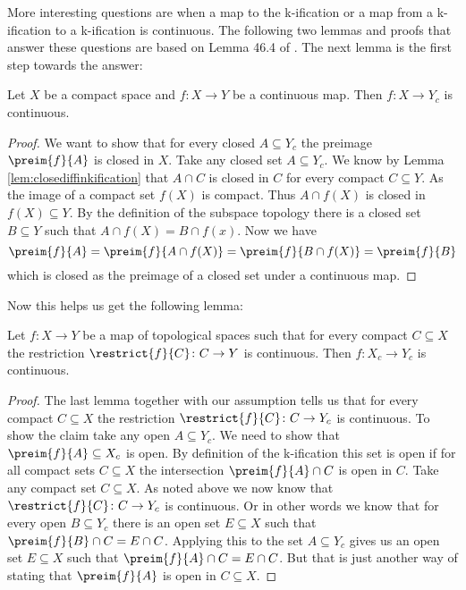 More interesting questions are when a map to the k-ification or a map from a k-ification to a k-ification is continuous. 
The following two lemmas and proofs that answer these questions are based on Lemma 46.4 of \cite{Munkres2014}.
The next lemma is the first step towards the answer:

\begin{lem}\label{lem:continuoustokification}
    Let $X$ be a compact space and $f \colon X \to Y$ be a continuous map. 
    Then $f \colon X \to Y_c$ is continuous.
\end{lem}
\begin{proof}
    We want to show that for every closed $A \subseteq Y_c$ the preimage $\preim{f}{A}$ is closed in $X$.
    Take any closed set $A \subseteq Y_c$. 
    We know by Lemma \ref{lem:closediffinkification} that $A \cap C$ is closed in $C$ for every compact $C \subseteq Y$.
    As the image of a compact set $f(X)$ is compact. 
    Thus $A \cap f(X)$ is closed in $f(X) \subseteq Y$. 
    By the definition of the subspace topology there is a closed set $B \subseteq Y$ such that $A \cap f(X) = B \cap f(x)$. 
    Now we have 
    \[\preim{f}{A} = \preim{f}{A \cap f(X)} = \preim{f}{B \cap f(X)} = \preim{f}{B}\]
    which is closed as the preimage of a closed set under a continuous map.
\end{proof}

Now this helps us get the following lemma:

\begin{lem}\label{lem:continuousofcontinuousoncompact}
    Let $f \colon X \to Y$ be a map of topological spaces such that for every compact $C \subseteq X$ the restriction $\restrict{f}{C} \colon C \to Y$ is continuous.
    Then $f \colon X_c \to Y_c$ is continuous.
\end{lem}
\begin{proof}
    The last lemma together with our assumption tells us that for every compact $C \subseteq X$ the restriction $\restrict{f}{C} \colon C \to Y_c$ is continuous.
    To show the claim take any open $A \subseteq Y_c$.
    We need to show that $\preim{f}{A} \subseteq X_c$ is open. 
    By definition of the k-ification this set is open if for all compact sets $C \subseteq X$ the intersection $\preim{f}{A} \cap C$ is open in $C$. 
    Take any compact set $C \subseteq X$. 
    As noted above we now know that $\restrict{f}{C} \colon C \to Y_c$ is continuous.
    Or in other words we know that for every open $B \subseteq Y_c$ there is an open set $E \subseteq X$ such that $\preim{f}{B} \cap C = E \cap C$.
    Applying this to the set $A \subseteq Y_c$ gives us an open set $E \subseteq X$ such that $\preim{f}{A} \cap C = E \cap C$.
    But that is just another way of stating that $\preim{f}{A}$ is open in $C \subseteq X$.
\end{proof}

